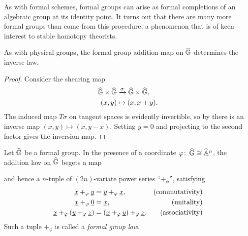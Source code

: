 \begin{remark}
As with formal schemes, formal groups can arise as formal completions of an algebraic group at its identity point.  It turns out that there are many more formal groups than come from this procedure, a phenomenon that is of keen interest to stable homotopy theorists.
\end{remark}

\begin{corollary}
As with physical groups, the formal group addition map on $\G$ determines the inverse law.
\end{corollary}
\begin{proof}
Consider the shearing map
\begin{align*}
\G \times \G & \xrightarrow{\sigma} \G \times \G, \\
(x, y) & \mapsto (x, x + y).
\end{align*}
The induced map $T\sigma$ on tangent spaces is evidently invertible, so by  there is an inverse map $(x, y) \mapsto (x, y - x)$.  Setting $y = 0$ and projecting to the second factor gives the inversion map.
\end{proof}

\begin{definition}\label{FGLDefinition}
Let $\G$ be a formal group.  In the presence of a coordinate $\phi \co \G \cong \A^n$, the addition law on $\G$ begets a map
\begin{center}
\end{center}
and hence a $n$-tuple of $(2n)$-variate power series ``$+_\phi$'', satisfying
\begin{align*}
\underline{\smash x} +_\phi \underline{\smash y} & = \underline{\smash y} +_\phi \underline{\smash x}, & \text{(commutativity)} \\
\underline{\smash x} +_\phi \underline{\smash 0} & = \underline{\smash x}, & \text{(unitality)} \\
\underline{\smash x} +_\phi (\underline{\smash y} +_\phi \underline{\smash z}) & = (\underline{\smash x} +_\phi \underline{\smash y}) +_\phi \underline{\smash z}. & \text{(associativity)}
\end{align*}
Such a tuple $+_\phi$ is called a \textit{formal group law}.
\end{definition}


